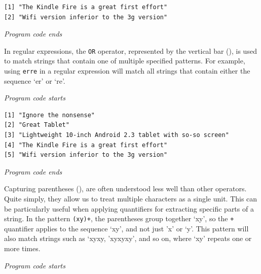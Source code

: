 \begin{verbatim}
[1] "The Kindle Fire is a great first effort"
[2] "Wifi version inferior to the 3g version"
\end{verbatim}

\emph{Program code ends}

In regular expressions, the \texttt{OR} operator, represented by the
vertical bar (\texttt{\textbar{}}), is used to match strings that
contain one of multiple specified patterns. For example, using
\texttt{er\textbar{}re} in a regular expression will match all strings
that contain either the sequence `er' or `re'.

\emph{Program code starts}

\begin{Shaded}
\begin{Highlighting}[]
\NormalTok{(} \NormalTok{)}
\end{Highlighting}
\end{Shaded}

\begin{verbatim}
[1] "Ignore the nonsense"                                     
[2] "Great Tablet"                                            
[3] "Lightweight 10-inch Android 2.3 tablet with so-so screen"
[4] "The Kindle Fire is a great first effort"                 
[5] "Wifi version inferior to the 3g version"                 
\end{verbatim}

\emph{Program code ends}

Capturing parentheses (), are often understood less well than other
operators. Quite simply, they allow us to treat multiple characters as a single unit. This can be particularly useful when applying quantifiers for extracting
specific parts of a string. In the pattern \texttt{(xy)+}, the parentheses group together `xy', so the \texttt{+} quantifier applies to
the sequence `xy', and not just 'x' or `y'. This pattern will also match strings
such as `xyxy, 'xyxyxy', and so on, where `xy' repeats one or more
times.

\emph{Program code starts}

\begin{Shaded}
\begin{Highlighting}[]
\NormalTok{(} \NormalTok{)}
\end{Highlighting}
\end{Shaded}

